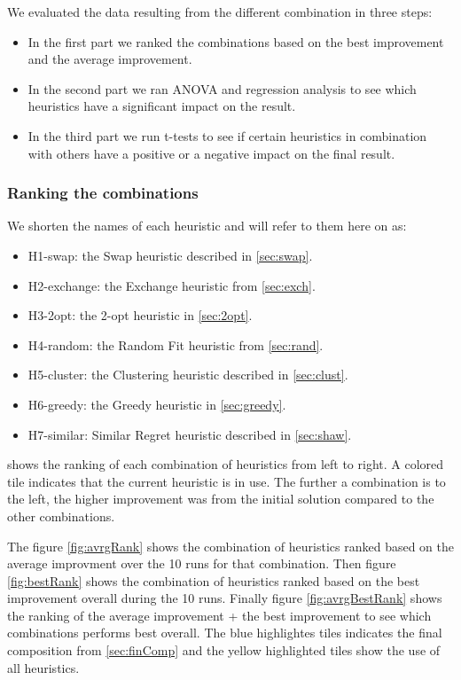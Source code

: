 \documentclass[../main.tex]{subfiles}
\begin{document}
\par We evaluated the data resulting from the different combination in three steps:
\begin{itemize}
    \item In the first part we ranked the combinations based on the best improvement and the average improvement.
    \item In the second part we ran ANOVA and regression analysis to see which heuristics have a significant impact on the result.
    \item In the third part we run t-tests to see if certain heuristics in combination with others have a positive or a negative impact on the final result.
\end{itemize}

\subsubsection{Ranking the combinations}
We shorten the names of each heuristic and will refer to them here on as:
\begin{itemize}
    \item H1-swap: the Swap heuristic described in \cref{sec:swap}.
    \item H2-exchange: the Exchange heuristic from \cref{sec:exch}.
    \item H3-2opt: the 2-opt heuristic in \cref{sec:2opt}.
    \item H4-random: the Random Fit heuristic from \cref{sec:rand}.
    \item H5-cluster: the Clustering heuristic described in \cref{sec:clust}.
    \item H6-greedy: the Greedy heuristic in \cref{sec:greedy}.
    \item H7-similar: Similar Regret heuristic described in \cref{sec:shaw}.
\end{itemize}

 shows the ranking of each combination of heuristics from left to right.
A colored tile indicates that the current heuristic is in use.
The further a combination is to the left, the higher improvement was from the initial solution compared to the other combinations. \par
The figure \ref{fig:avrgRank} shows the combination of heuristics ranked based on the average improvment over the 10 runs for that combination.
Then figure \ref{fig:bestRank} shows the combination of heuristics ranked based on the best improvement overall during the 10 runs.
Finally figure \ref{fig:avrgBestRank} shows the ranking of the average improvement + the best improvement to see which combinations performs best overall.
The blue highlightes tiles indicates the final composition from \cref{sec:finComp} and the yellow highlighted tiles show the use of all heuristics.
\end{document}
